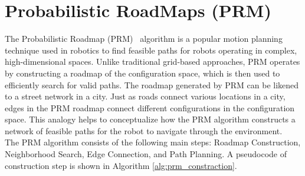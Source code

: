 \documentclass{ctuthesis}
\begin{document}
\section{Probabilistic RoadMaps (PRM)}
The Probabilistic Roadmap (PRM)~\cite{Kavraki1996PRM} algorithm is a 
popular motion planning technique used in robotics to find feasible paths 
for robots operating in complex, high-dimensional spaces. 
Unlike traditional grid-based approaches, 
PRM operates by constructing a roadmap of the configuration space, 
which is then used to efficiently search for valid paths.
The roadmap generated by PRM can be likened to a street network in a city. 
Just as roads connect various locations in a city, 
edges in the PRM roadmap connect different configurations in the configuration space. 
This analogy helps to conceptualize how the PRM algorithm constructs a network of 
feasible paths for the robot to navigate through the environment.
\\[12pt]
The PRM algorithm consists of the following main steps: 
Roadmap Construction, Neighborhood Search, Edge Connection, and Path Planning.
A pseudocode of construction step is shown in Algorithm \ref{alg:prm_constraction}.
\end{document}
